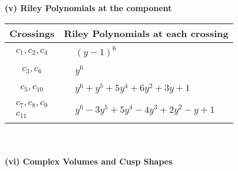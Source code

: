 \documentclass[1p]{elsarticle_modified}
\theoremstyle{definition}
\begin{document}
\newpage\renewcommand{\arraystretch}{1}
\flushleft \textbf{(v) Riley Polynomials at the component}\newline \\
\begin{tabular}{m{50pt}|m{274pt}}
Crossings & \hspace{64pt}Riley Polynomials at each crossing \\
\hline $$\begin{aligned}c_{1},c_{2},c_{4}\end{aligned}$$&$\begin{aligned}
&(y-1)^6
\end{aligned}$\\
\hline $$\begin{aligned}c_{3},c_{6}\end{aligned}$$&$\begin{aligned}
&y^6
\end{aligned}$\\
\hline $$\begin{aligned}c_{5},c_{10}\end{aligned}$$&$\begin{aligned}
&y^6+y^5+5 y^4+6 y^2+3 y+1
\end{aligned}$\\
\hline $$\begin{aligned}c_{7},c_{8},c_{9}\\c_{11}\end{aligned}$$&$\begin{aligned}
&y^6-3 y^5+5 y^4-4 y^3+2 y^2- y+1
\end{aligned}$\\
\hline
\end{tabular}\\~\\
\newpage\flushleft \textbf{(vi) Complex Volumes and Cusp Shapes}
\end{document}
